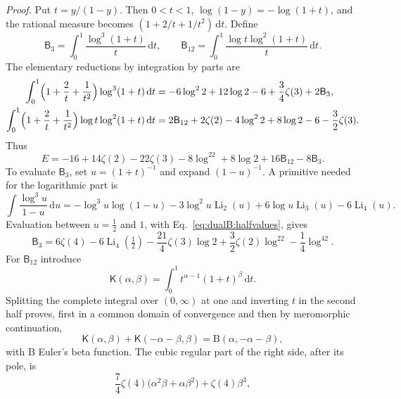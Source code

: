\documentclass[11pt,a4paper]{article}
\numberwithin{equation}{section}
\newcommand{\dd}{\,\mathrm d}
\newcommand{\Li}{\operatorname{Li}}
\begin{document}
\emph{Proof.} Put $t=y/(1-y)$. Then $0<t<1$, $\log(1-y)=-\log(1+t)$, and the rational measure becomes
$(1+2/t+1/t^2)\dd t$. Define
\begin{equation}
 \mathsf B_3=\int_0^1\frac{\log^3(1+t)}{t}\dd t,\qquad \mathsf B_{12}=\int_0^1\frac{\log t\log^2(1+t)}{t}\dd t.
\end{equation}
The elementary reductions by integration by parts are
\begin{equation}
\begin{aligned}
 \int_0^1\Bigl(1+\frac2t+\frac1{t^2}\Bigr)\log^3(1+t)\dd t&=-6\log^22+12\log2-6+\frac34\zeta(3)+2\mathsf B_3,\\
 \int_0^1\Bigl(1+\frac2t+\frac1{t^2}\Bigr)\log t\log^2(1+t)\dd t&=2\mathsf B_{12}+2\zeta(2)-4\log^22+8\log2-6
 -\frac32\zeta(3).
\end{aligned}
\end{equation}
Thus
\begin{equation}
 E=-16+14\zeta(2)-22\zeta(3)-8\log^22+8\log2+16\mathsf B_{12}-8\mathsf B_3.
 \label{eq:dualB:Eintermediate}
\end{equation}
To evaluate $\mathsf B_3$, set $u=(1+t)^{-1}$ and expand $(1-u)^{-1}$. A primitive needed for the logarithmic part is
\begin{equation}
 \int\frac{\log^3u}{1-u}\dd u=-\log^3u\log(1-u)-3\log^2u\Li_2(u)+6\log u\Li_3(u)-6\Li_4(u).
\end{equation}
Evaluation between $u=\frac12$ and $1$, with Eq.~\eqref{eq:dualB:halfvalues}, gives
\begin{equation}
 \mathsf B_3=6\zeta(4)-6\Li_4(\tfrac12)-\frac{21}{4}\zeta(3)\log2+\frac32\zeta(2)\log^22-\frac14\log^42.
 \label{eq:dualB:B3}
\end{equation}
For $\mathsf B_{12}$ introduce
\begin{equation}
 \mathsf K(\alpha,\beta)=\int_0^1t^{\alpha-1}(1+t)^\beta\dd t.
\end{equation}
Splitting the complete integral over $(0,\infty)$ at one and inverting $t$ in the second half proves, first in a
common domain of convergence and then by meromorphic continuation,
\begin{equation}
 \mathsf K(\alpha,\beta)+\mathsf K(-\alpha-\beta,\beta)=\mathrm B(\alpha,-\alpha-\beta),
 \label{eq:dualB:betareflection}
\end{equation}
with $\mathrm B$ Euler's beta function. The cubic regular part of the right side, after its pole, is
\begin{equation}
 \frac74\zeta(4)\bigl(\alpha^2\beta+\alpha\beta^2\bigr)+\zeta(4)\beta^3,
\end{equation}
\end{document}
